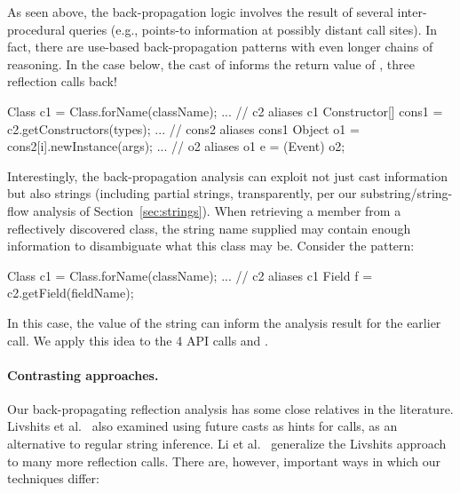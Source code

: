 As seen above, the back-propagation logic involves the result of
several inter-procedural queries (e.g., points-to information at
possibly distant call sites). In fact, there are use-based
back-propagation patterns with even longer chains of reasoning. In the
case below, the cast of  informs the return value of
, three reflection calls back!

\begin{javacodelinum}
Class c1 = Class.forName(className);
...      // c2 aliases c1
Constructor[] cons1 = c2.getConstructors(types); 
...      // cons2 aliases cons1
Object o1 = cons2[i].newInstance(args); 
...      // o2 aliases o1
e = (Event) o2;    
\end{javacodelinum}

Interestingly, the back-propagation analysis can exploit not just cast
information but also strings (including partial strings, transparently,
per our substring/string-flow analysis of Section~\ref{sec:strings}).
When retrieving a member from a reflectively discovered class, the
string name supplied may contain enough information to disambiguate
what this class may be. Consider the pattern:

\begin{javacodelinum}
Class c1 = Class.forName(className);
...      // c2 aliases c1
Field f = c2.getField(fieldName); 
\end{javacodelinum}

In this case, the value of the  string can inform the
analysis result for the earlier  call. We apply this
idea to the 4 API calls  and
.

\paragraph{Contrasting approaches.}

Our back-propagating reflection analysis
has some close relatives in the literature.  Livshits et
al.~\cite{aplas/LivshitsWL05,livshits:thesis} also examined using
future casts as hints for  calls, as an alternative to
regular string inference. Li et al.~\cite{ecoop/LiTSX14} generalize
the Livshits approach to many more reflection calls. There are,
however, important ways in which our techniques differ:

